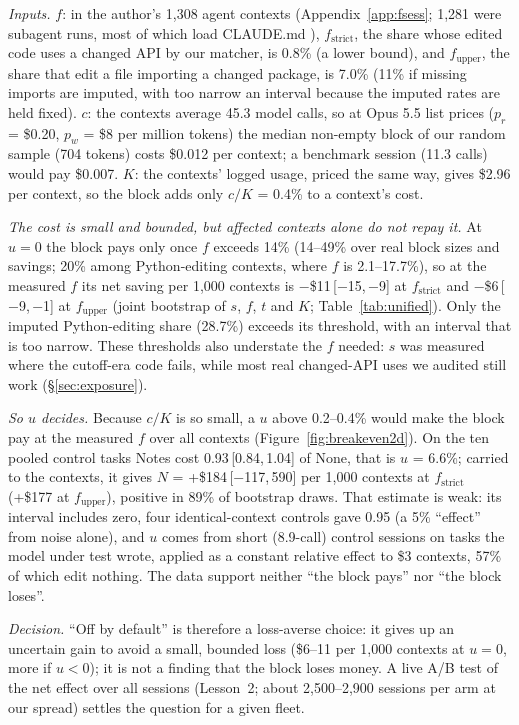 \documentclass[11pt]{article}
\newcommand{\ci}[2]{\,[#1,\,#2]}
\newcommand{\aNone}{\textsf{None}\xspace}
\newcommand{\aNotes}{\textsf{Notes}\xspace}
\begin{document}
\emph{Inputs.} $f$: in the author's 1,308 agent contexts (Appendix~\ref{app:fsess}; 1,281 were subagent runs, most of which load CLAUDE.md \citep{claudecode}), $f_\text{strict}$, the share whose edited code uses a changed API by our matcher, is 0.8\% (a lower bound), and $f_\text{upper}$, the share that edit a file importing a changed package, is 7.0\% (11\% if missing imports are imputed, with too narrow an interval because the imputed rates are held fixed).
$c$: the contexts average 45.3 model calls, so at Opus 5.5 list prices ($p_r$ = \$0.20, $p_w$ = \$8 per million tokens) the median non-empty block of our random sample (704 tokens) costs \$0.012 per context; a benchmark session (11.3 calls) would pay \$0.007.
$K$: the contexts' logged usage, priced the same way, gives \$2.96 per context, so the block adds only $c/K$ = 0.4\% to a context's cost.

\emph{The cost is small and bounded, but affected contexts alone do not repay it.} At $u = 0$ the block pays only once $f$ exceeds 14\% (14--49\% over real block sizes and savings; 20\% among Python-editing contexts, where $f$ is 2.1--17.7\%), so at the measured $f$ its net saving per 1,000 contexts is $-$\$11\ci{$-$15}{$-$9} at $f_\text{strict}$ and $-$\$6\ci{$-$9}{$-$1} at $f_\text{upper}$ (joint bootstrap of $s$, $f$, $t$ and $K$; Table~\ref{tab:unified}).
Only the imputed Python-editing share (28.7\%) exceeds its threshold, with an interval that is too narrow.
These thresholds also understate the $f$ needed: $s$ was measured where the cutoff-era code fails, while most real changed-API uses we audited still work (\S\ref{sec:exposure}).

\emph{So $u$ decides.} Because $c/K$ is so small, a $u$ above 0.2--0.4\% would make the block pay at the measured $f$ over all contexts (Figure~\ref{fig:breakeven2d}).
On the ten pooled control tasks \aNotes cost 0.93\ci{0.84}{1.04} of \aNone, that is $u$ = 6.6\%; carried to the contexts, it gives $N$ = +\$184\ci{$-$117}{590} per 1,000 contexts at $f_\text{strict}$ (+\$177 at $f_\text{upper}$), positive in 89\% of bootstrap draws.
That estimate is weak: its interval includes zero, four identical-context controls gave 0.95 (a 5\% ``effect'' from noise alone), and $u$ comes from short (8.9-call) control sessions on tasks the model under test wrote, applied as a constant relative effect to \$3 contexts, 57\% of which edit nothing.
The data support neither ``the block pays'' nor ``the block loses''.

\emph{Decision.} ``Off by default'' is therefore a loss-averse choice: it gives up an uncertain gain to avoid a small, bounded loss (\$6--11 per 1,000 contexts at $u = 0$, more if $u<0$); it is not a finding that the block loses money.
A live A/B test of the net effect over all sessions (Lesson~2; about 2,500--2,900 sessions per arm at our spread) settles the question for a given fleet.
\end{document}
